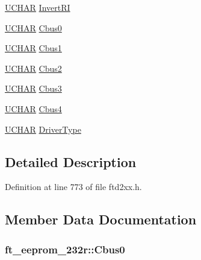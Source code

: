 \begin{DoxyCompactItemize}
\item 
\hyperlink{LALUsbx64_2include_2WinTypes_8h_a4f4bb67531a9bf6f0b9c6ad76aeba587}{UCHAR} \hyperlink{structft__eeprom__232r_a1f9d1fbebcbc86c8a27d2abf6b9169f7}{InvertRI}
\item 
\hyperlink{LALUsbx64_2include_2WinTypes_8h_a4f4bb67531a9bf6f0b9c6ad76aeba587}{UCHAR} \hyperlink{structft__eeprom__232r_a1d81e0319e53a72bd067a3de6387f4d8}{Cbus0}
\item 
\hyperlink{LALUsbx64_2include_2WinTypes_8h_a4f4bb67531a9bf6f0b9c6ad76aeba587}{UCHAR} \hyperlink{structft__eeprom__232r_aa0ed7fa40a23e6e17359c1fec9dc2677}{Cbus1}
\item 
\hyperlink{LALUsbx64_2include_2WinTypes_8h_a4f4bb67531a9bf6f0b9c6ad76aeba587}{UCHAR} \hyperlink{structft__eeprom__232r_a697c610b8e23ae556274c34703fd0582}{Cbus2}
\item 
\hyperlink{LALUsbx64_2include_2WinTypes_8h_a4f4bb67531a9bf6f0b9c6ad76aeba587}{UCHAR} \hyperlink{structft__eeprom__232r_af6c591aa67f0e9ff287da8af81f7399e}{Cbus3}
\item 
\hyperlink{LALUsbx64_2include_2WinTypes_8h_a4f4bb67531a9bf6f0b9c6ad76aeba587}{UCHAR} \hyperlink{structft__eeprom__232r_a390714a332684ea05618238e7388773f}{Cbus4}
\item 
\hyperlink{LALUsbx64_2include_2WinTypes_8h_a4f4bb67531a9bf6f0b9c6ad76aeba587}{UCHAR} \hyperlink{structft__eeprom__232r_a43812e19d6119e277b91f10e8db8b651}{DriverType}
\end{DoxyCompactItemize}


\subsection{Detailed Description}


Definition at line 773 of file ftd2xx.h.

\subsection{Member Data Documentation}
\hypertarget{structft__eeprom__232r_a1d81e0319e53a72bd067a3de6387f4d8}{
\subsubsection[{Cbus0}]{ {\bf ft\_\-eeprom\_\-232r::Cbus0}}}
\label{structft__eeprom__232r_a1d81e0319e53a72bd067a3de6387f4d8}


